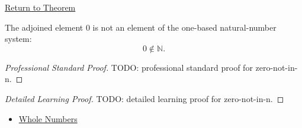 \newpage
{}
\label{prf:zero-not-in-n}

\begin{remark*}[Return]
\hyperref[thm:zero-not-in-n]{Return to Theorem}
\end{remark*}

\begin{theorem*}
The adjoined element $0$ is not an element of the one-based natural-number
system:
\[
0\notin\mathbb{N}.
\]
\end{theorem*}

\begin{proof}[Professional Standard Proof]
\LRAProofBodyStart
TODO: professional standard proof for zero-not-in-n.
\end{proof}

\begin{proof}[Detailed Learning Proof]
\LRAProofBodyStart
TODO: detailed learning proof for zero-not-in-n.
\end{proof}

\begin{remark*}
\end{remark*}

\begin{dependencies}
\begin{itemize}
  \item \hyperref[def:whole-numbers]{Whole Numbers}
\end{itemize}
\end{dependencies}

\clearpage

